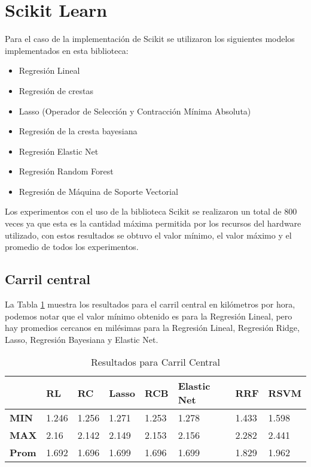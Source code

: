 \section{Scikit Learn}

Para el caso de la implementación de Scikit se utilizaron los siguientes modelos implementados en esta biblioteca:

\begin{itemize}
    \item Regresión Lineal
    \item Regresión de crestas
    \item Lasso (Operador de Selección y Contracción Mínima Absoluta)
    \item Regresión de la cresta bayesiana
    \item Regresión Elastic Net
    \item Regresión Random Forest
    \item Regresión de Máquina de Soporte Vectorial
\end{itemize}

Los experimentos con el uso de la biblioteca Scikit se realizaron un total de 800 veces ya que esta es la cantidad máxima permitida por los recursos del hardware utilizado, con estos resultados se obtuvo el valor mínimo, el valor máximo y el promedio de todos los experimentos.

\subsection{Carril central}

La Tabla \ref{tab:resultadosScikitCarrilCentral} muestra los resultados para el carril central en kilómetros por hora, podemos notar que el valor mínimo obtenido es para la Regresión Lineal, pero hay promedios cercanos en milésimas para la Regresión Lineal, Regresión Ridge, Lasso, Regresión Bayesiana y Elastic Net.

\begin{table}[H]
    \centering
    \caption{Resultados para Carril Central}
    \label{tab:resultadosScikitCarrilCentral}
    \begin{tabular}{|l|l|l|l|l|l|l|l|} \hline
        & \textbf{RL} & \textbf{RC} & \textbf{Lasso} & \textbf{RCB} & \textbf{Elastic Net} & \textbf{RRF} & \textbf{RSVM} \\ \hline

        \textbf{MIN} & 1.246 & 1.256 & 1.271 & 1.253 & 1.278 & 1.433 & 1.598 \\ \hline
        \textbf{MAX} & 2.16 & 2.142 & 2.149 & 2.153 & 2.156 & 2.282 & 2.441 \\ \hline
        \textbf{Prom} & 1.692 & 1.696 & 1.699 & 1.696 & 1.699 & 1.829 & 1.962 \\ \hline
    \end{tabular}
\end{table}


